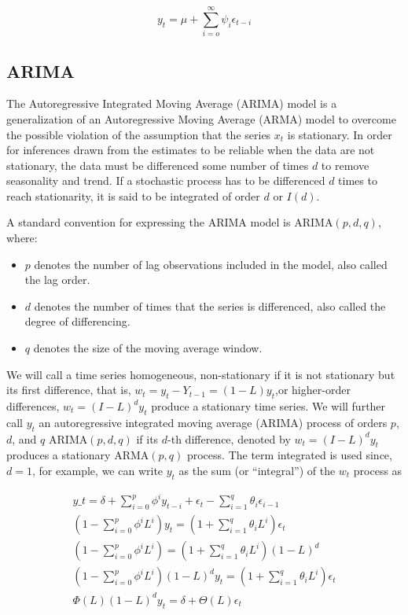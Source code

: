 \documentclass[
  11pt,
]{article}
\begin{document}
\[
y_{t} = \mu + \sum\limits_{i= o}^{\infty}\psi_{i}\epsilon_{t-i}
\]

\hypertarget{arima}{%
\subsection{ARIMA}\label{arima}}

The Autoregressive Integrated Moving Average (ARIMA) model is a
generalization of an Autoregressive Moving Average (ARMA) model to
overcome the possible violation of the assumption that the series
\(x_{t}\) is stationary. In order for inferences drawn from the
estimates to be reliable when the data are not stationary, the data must
be differenced some number of times \(d\) to remove seasonality and
trend. If a stochastic process has to be differenced \(d\) times to
reach stationarity, it is said to be integrated of order \(d\) or
\(I(d)\).

A standard convention for expressing the ARIMA model is
\(\mathrm{ARIMA}(p, d, q)\), where:

\begin{itemize}
\item
  \(p\) denotes the number of lag observations included in the model,
  also called the lag order.
\item
  \(d\) denotes the number of times that the series is differenced, also
  called the degree of differencing.
\item
  \(q\) denotes the size of the moving average window.
\end{itemize}

We will call a time series homogeneous, non-stationary if it is not
stationary but its first difference, that is,
\(w_{t} = y_{t} - Y_{t-1} =(1 - L)y_{t}\),or higher-order differences,
\(w_{t} =(I- L)^{d}y_{t}\) produce a stationary time series. We will
further call \(y_{t}\) an autoregressive integrated moving average
(\(\mathrm{ARIMA}\)) process of orders \(p\), \(d\), and \(q\)
\(\mathrm{ARIMA}(p, d, q)\) if its \(d\)-th difference, denoted by
\(w_{t} =(I- L)^{d}y_{t}\) produces a stationary \(\mathrm{ARMA}(p, q)\)
process. The term integrated is used since, \(d = 1\), for example, we
can write \(y_{t}\) as the sum (or ``integral'') of the \(w_{t}\)
process as

\begin{gather*}
y\_{t} = \delta + \sum\limits_{i=0}^{p}\phi^{i}y_{t- i} + \epsilon_{t} - \sum\limits_{i=1}^{q}\theta_{i}\epsilon_{i-1} \\[8pt]
\left(1 - \sum\limits_{i=0}^{p}\phi^{i}L^{i}\right)y_{t} = \left(1 + \sum\limits_{i=1}^{q}\theta_{i}L^{i}\right)\epsilon_{t} \\[8pt]
\left(1 - \sum\limits_{i=0}^{p}\phi^{i}L^{i}\right) = \left(1 + \sum\limits_{i=1}^{q}\theta_{i}L^{i}\right)\left(1 - L\right)^{d} \\[8pt]
\left(1 - \sum\limits_{i=0}^{p}\phi^{i}L^{i}\right)\left(1 - L\right)^{d}y_{t} = \left(1 + \sum\limits_{i=1}^{q}\theta_{i}L^{i}\right)\epsilon_{t} \\[8pt]
\Phi(L)(1 - L)^{d}y_{t} = \delta + \Theta(L)\epsilon_{t}
\end{gather*}
\end{document}
